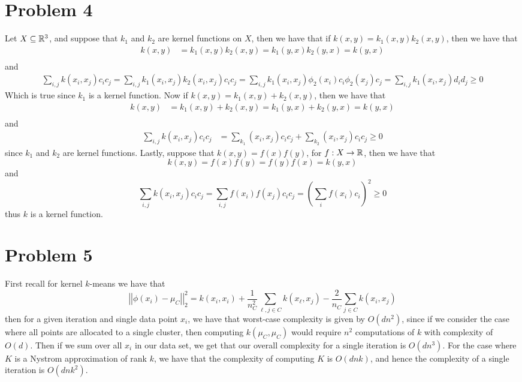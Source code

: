 \documentclass[12pt]{report}
\newcommand{\norm}[1]{\left|\left|#1\right|\right|}
\begin{document}
\section*{Problem 4}
Let $X \subseteq \mathbb{R}^3$, and suppose that $k_1$ and $k_2$ are kernel functions on $X$, then we have that if $k(x,y) = k_1(x,y)k_2(x,y)$, then we have that
\begin{align*}
  k(x,y) &= k_1(x,y)k_2(x,y) = k_1(y,x)k_2(y,x) = k(y,x) \\
\end{align*}
and
\begin{align*}
  \sum_{i,j} k(x_i,x_j)c_ic_j = \sum_{i,j}k_1(x_i,x_j)k_2(x_i,x_j)c_ic_j = \sum_{i,j} k_1(x_i,x_j) \phi_2(x_i)c_i \phi_2(x_j)c_j = \sum_{i,j} k_1(x_i,x_j)d_i d_j \geq 0 
\end{align*}
Which is true since $k_1$ is a kernel function. Now if $k(x,y) = k_1(x,y) + k_2(x,y)$, then we have that
\begin{align*}
  k(x,y) &= k_1(x,y) + k_2(x,y) = k_1(y,x) + k_2(y,x) = k(y,x) \\
\end{align*}
and
\begin{align*}
  \sum_{i,j} k(x_i,x_j) c_ic_j  &= \sum_{k_1}(x_i,x_j)c_ic_j + \sum_{k_2}(x_i,x_j)c_ic_j \geq 0
\end{align*}
since $k_1$ and $k_2$ are kernel functions. Lastly, suppose that $k(x,y) = f(x)f(y)$, for $f: X \to \mathbb{R}$, then we have that
\begin{equation*}
  k(x,y) = f(x)f(y) = f(y)f(x) = k(y,x)
\end{equation*}
and
\begin{equation*}
  \sum_{i,j} k(x_i,x_j)c_ic_j = \sum_{i,j} f(x_i)f(x_j)c_ic_j = \left(\sum_{i} f(x_i)c_i\right)^2 \geq 0
\end{equation*}
thus $k$ is a kernel function.

\section*{Problem 5}
First recall for kernel $k$-means we have that
\begin{equation*}
  \norm{\phi(x_i) - \mu_C}_2^2 = k(x_i,x_i) + \frac{1}{n_C^2} \sum_{\ell,j \in C}k(x_\ell,x_j) - \frac{2}{n_C} \sum_{j \in C}k(x_i,x_j)
\end{equation*}
then for a given iteration and single data point $x_i$, we have that worst-case complexity is given by $O(dn^2)$, since if we consider the case where all points are allocated to a single cluster, then computing $k(\mu_C,\mu_C)$ would require $n^2$ computations of $k$ with complexity of $O(d)$. Then if we sum over all $x_i$ in our data set, we get that our overall complexity for a single iteration is $O(dn^3)$. For the case where $K$ is a Nystrom approximation of rank $k$, we have that the complexity of computing $K$ is $O(dnk)$, and hence the complexity of a single iteration is $O(dnk^2)$.
\end{document}

